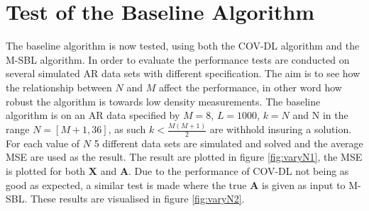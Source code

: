 \section{Test of the Baseline Algorithm}
The baseline algorithm is now tested, using both the COV-DL algorithm and the M-SBL algorithm. In order to evaluate the performance tests are conducted on several simulated AR data sets with different specification. The aim is to see how the relationship between $N$ and $M$ affect the performance, in other word how robust the algorithm is towards low density measurements. 
The baseline algorithm is on an AR data specified by $M=8$, $L=1000$, $k=N$ and N in the range $N = [M+1, 36]$, as such $k<\frac{M(M+1)}{2}$ are withhold insuring a solution.
For each value of $N$ 5 different data sets are simulated and solved and the average MSE are used as the result. The result are plotted in figure \ref{fig:varyN1}, the MSE is plotted for both $\textbf{X}$ and $\textbf{A}$. 
Due to the performance of COV-DL not being as good as expected, a similar test is made where the true $\textbf{A}$ is given as input to M-SBL. These results are visualised in figure \ref{fig:varyN2}.    
      
